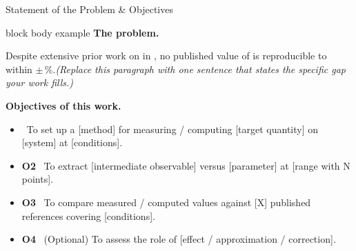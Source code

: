 \begin{frame}{Statement of the Problem \& Objectives}
  \begin{beamercolorbox}[wd=.96\paperwidth, sep=8pt]{block body example}
    \textbf{\color{sustBlueDark}The problem.}%
    \medskip
    
    Despite extensive prior work on  in
    , no published value of   is reproducible to
    within $\pm$\,\highlight{[X]}\%.\hspace{1em}\emph{(Replace this paragraph
    with one sentence that states the specific gap your work fills.)}
  \end{beamercolorbox}

  \vspace{0.2cm}
  \textbf{\color{sustBlueDark}Objectives of this work.}
  \begin{itemize}\setlength\itemsep{2pt}
    \item {} \, To set up a [method] for measuring /
          computing [target quantity] on [system] at [conditions].
    \item \textbf{O2} \, To extract [intermediate observable] versus
          [parameter] at [range with N points].
    \item \textbf{O3} \, To compare measured / computed values against
          [X] published references covering [conditions].
    \item \textbf{O4} \, (Optional) To assess the role of [effect /
          approximation / correction].
  \end{itemize}

  \vspace{0.1cm}
\end{frame}
